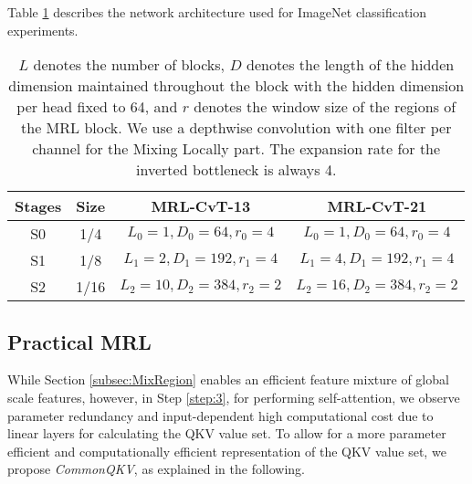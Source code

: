 \documentclass{article}
\begin{document}
Table \ref{table:cvtmodel} describes the network architecture used for ImageNet classification experiments. 
\begin{table}[htbp] 
  \centering
  \caption{$L$ denotes the number of blocks, $D$ denotes the length of the hidden dimension maintained throughout the block with the hidden dimension per head fixed to 64, and $r$ denotes the window size of the regions of the MRL block. We use a depthwise convolution with one filter per channel for the Mixing Locally part. The expansion rate for the inverted bottleneck is always 4.} \label{table:cvtmodel}
\begin{tabular}{c|c|c|c}
    \toprule
    Stages & Size  & MRL-CvT-13 & MRL-CvT-21 \\
    \midrule
    S0    & 1/4   & $L_0 = 1, D_0 = 64, r_0 = 4 $ & $L_0 = 1, D_0 = 64, r_0 = 4$  \\
    \midrule
    S1    & 1/8   & $L_1 = 2, D_1 = 192, r_1 = 4$ & $L_1 = 4, D_1 = 192, r_1 = 4$ \\
    \midrule
    S2    & 1/16  & $L_2 = 10, D_2 = 384, r_2 = 2$ & $L_2 = 16, D_2 = 384, r_2 = 2$ \\
    \end{tabular}\end{table}

\subsection{Practical MRL}\label{subsec:implement}
While Section \ref{subsec:MixRegion} enables an efficient feature mixture of global scale features, however, in Step \ref{step:3}, for performing self-attention, we observe parameter redundancy and input-dependent high computational cost due to linear layers for calculating the QKV value set. To allow for a more parameter efficient and computationally efficient representation of the QKV value set, we propose \textit{CommonQKV}, as explained in the following.
\end{document}
